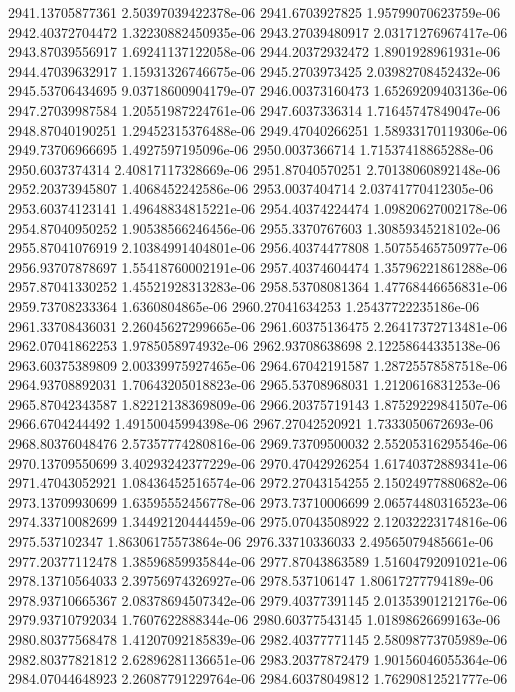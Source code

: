 {2941.13705877361 2.50397039422378e-06
2941.6703927825 1.95799070623759e-06
2942.40372704472 1.32230882450935e-06
2943.27039480917 2.03171276967417e-06
2943.87039556917 1.69241137122058e-06
2944.20372932472 1.8901928961931e-06
2944.47039632917 1.15931326746675e-06
2945.2703973425 2.03982708452432e-06
2945.53706434695 9.03718600904179e-07
2946.00373160473 1.65269209403136e-06
2947.27039987584 1.20551987224761e-06
2947.6037336314 1.71645747849047e-06
2948.87040190251 1.29452315376488e-06
2949.47040266251 1.58933170119306e-06
2949.73706966695 1.4927597195096e-06
2950.0037366714 1.71537418865288e-06
2950.6037374314 2.40817117328669e-06
2951.87040570251 2.70138060892148e-06
2952.20373945807 1.4068452242586e-06
2953.0037404714 2.03741770412305e-06
2953.60374123141 1.49648834815221e-06
2954.40374224474 1.09820627002178e-06
2954.87040950252 1.90538566246456e-06
2955.3370767603 1.30859345218102e-06
2955.87041076919 2.10384991404801e-06
2956.40374477808 1.50755465750977e-06
2956.93707878697 1.55418760002191e-06
2957.40374604474 1.35796221861288e-06
2957.87041330252 1.45521928313283e-06
2958.53708081364 1.47768446656831e-06
2959.73708233364 1.6360804865e-06
2960.27041634253 1.25437722235186e-06
2961.33708436031 2.26045627299665e-06
2961.60375136475 2.26417372713481e-06
2962.07041862253 1.9785058974932e-06
2962.93708638698 2.12258644335138e-06
2963.60375389809 2.00339975927465e-06
2964.67042191587 1.28725578587518e-06
2964.93708892031 1.70643205018823e-06
2965.53708968031 1.2120616831253e-06
2965.87042343587 1.82212138369809e-06
2966.20375719143 1.87529229841507e-06
2966.6704244492 1.49150045994398e-06
2967.27042520921 1.7333050672693e-06
2968.80376048476 2.57357774280816e-06
2969.73709500032 2.55205316295546e-06
2970.13709550699 3.40293242377229e-06
2970.47042926254 1.61740372889341e-06
2971.47043052921 1.08436452516574e-06
2972.27043154255 2.15024977880682e-06
2973.13709930699 1.63595552456778e-06
2973.73710006699 2.06574480316523e-06
2974.33710082699 1.34492120444459e-06
2975.07043508922 2.12032223174816e-06
2975.537102347 1.86306175573864e-06
2976.33710336033 2.49565079485661e-06
2977.20377112478 1.38596859935844e-06
2977.87043863589 1.51604792091021e-06
2978.13710564033 2.39756974326927e-06
2978.537106147 1.80617277794189e-06
2978.93710665367 2.08378694507342e-06
2979.40377391145 2.01353901212176e-06
2979.93710792034 1.7607622888344e-06
2980.60377543145 1.01898626699163e-06
2980.80377568478 1.41207092185839e-06
2982.40377771145 2.58098773705989e-06
2982.80377821812 2.62896281136651e-06
2983.20377872479 1.90156046055364e-06
2984.07044648923 2.26087791229764e-06
2984.60378049812 1.76290812521777e-06
}
